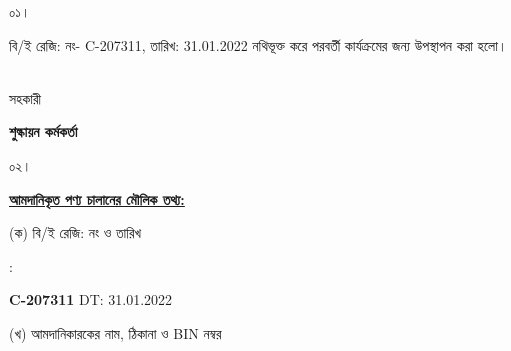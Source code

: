 \documentclass[12pt]{article}
\newcommand{\beno}{C-207311}
\newcommand{\bedt}{31.01.2022}
\begin{document}
\noindent
\begin{minipage}[t]{0.05\linewidth}
০১।
\end{minipage}
\begin{minipage}[t]{0.95\linewidth}
বি/ই রেজি: নং- {\beno}, তারিখ: {\bedt}
নথিভূক্ত করে
পরবর্তী কার্যক্রমের জন্য উপস্থাপন করা হলো।
\\
\\
\end{minipage}
\begin{minipage}[t]{0.05\linewidth}
\hspace*{0em}
\end{minipage}
\begin{minipage}[t]{0.05\linewidth}
সহকারী
\end{minipage}
\begin{minipage}[t]{0.37\linewidth}
\hspace{0em}
\end{minipage}
\begin{minipage}[t]{0.53\linewidth}
\textbf{শুল্কায়ন কর্মকর্তা}
\\
\end{minipage}
\begin{minipage}[t]{0.05\linewidth}
০২।
\end{minipage}
\begin{minipage}[t]{0.95\linewidth}
\underline{\textbf {আমদানিকৃত পণ্য চালানের
মৌলিক তথ্য:}}
\\
\end{minipage}
\footnotesize
\begin{minipage}[t]{0.05\linewidth}
\hspace*{1em}
\end{minipage}
\begin{minipage}[t]{0.40\linewidth}
(ক) বি/ই রেজি: নং ও তারিখ
\end{minipage}
\begin{minipage}[t]{0.02\linewidth}
:
\end{minipage}
\begin{minipage}[t]{0.53\linewidth}
\textbf{{\beno}} \hspace{2em} DT: {\bedt}
\\
\end{minipage}
\begin{minipage}[t]{0.05\linewidth}
\hspace*{1em}
\end{minipage}
\begin{minipage}[t]{0.40\linewidth}
(খ) আমদানিকারকের নাম, ঠিকানা
ও BIN নম্বর
\end{minipage}
\end{document}

